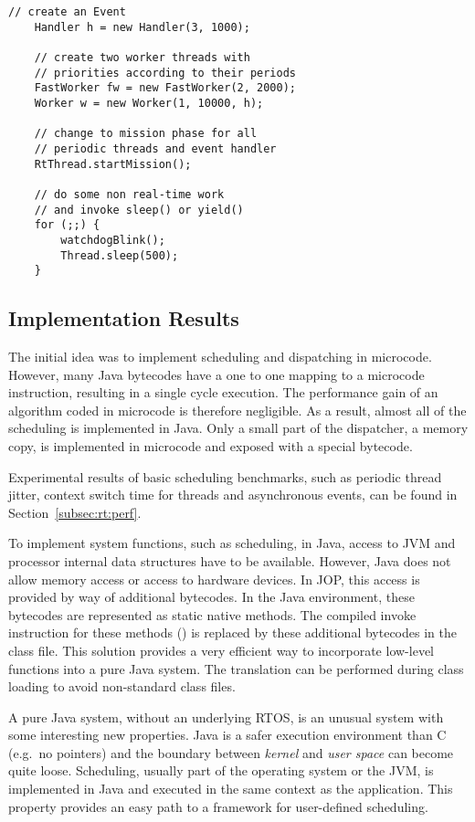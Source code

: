\begin{lstlisting}[float,caption={Start of the application},
label=lst:arch:rt:profile:usage]
    // create an Event
    Handler h = new Handler(3, 1000);

    // create two worker threads with
    // priorities according to their periods
    FastWorker fw = new FastWorker(2, 2000);
    Worker w = new Worker(1, 10000, h);

    // change to mission phase for all
    // periodic threads and event handler
    RtThread.startMission();

    // do some non real-time work
    // and invoke sleep() or yield()
    for (;;) {
        watchdogBlink();
        Thread.sleep(500);
    }
\end{lstlisting}

\subsection{Implementation Results}

The initial idea was to implement scheduling and dispatching in
microcode. However, many Java bytecodes have a one to one mapping to
a microcode instruction, resulting in a single cycle execution. The
performance gain of an algorithm coded in microcode is therefore
negligible. As a result, almost all of the scheduling is implemented
in Java. Only a small part of the dispatcher, a memory copy, is
implemented in microcode and exposed with a special bytecode.

Experimental results of basic scheduling benchmarks, such as
periodic thread jitter, context switch time for threads and
asynchronous events, can be found in Section~\ref{subsec:rt:perf}.

To implement system functions, such as scheduling, in Java, access
to JVM and processor internal data structures have to be available.
However, Java does not allow memory access or access to hardware
devices. In JOP, this access is provided by way of additional
bytecodes. In the Java environment, these bytecodes are represented
as static native methods. The compiled invoke instruction for these
methods () is replaced by these additional
bytecodes in the class file. This solution provides a very efficient
way to incorporate low-level functions into a pure Java system. The
translation can be performed during class loading to avoid
non-standard class files.

A pure Java system, without an underlying RTOS, is an unusual system
with some interesting new properties. Java is a safer execution
environment than C (e.g.\ no pointers) and the boundary between
\emph{kernel} and \emph{user space} can become quite loose.
Scheduling, usually part of the operating system or the JVM, is
implemented in Java and executed in the same context as the
application. This property provides an easy path to a framework for
user-defined scheduling.
